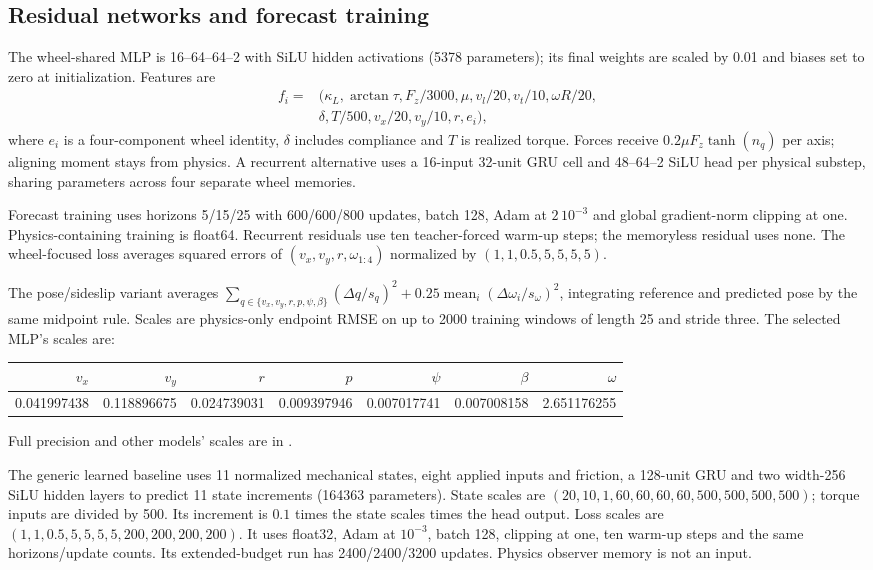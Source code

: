 \documentclass[11pt]{article}
\newcommand{\src}[1]{\texttt{\detokenize{#1}}}
\begin{document}
\subsection{Residual networks and forecast training}
The wheel-shared MLP is 16--64--64--2 with SiLU hidden activations (5378 parameters); its final weights are scaled by 0.01 and biases set to zero at initialization. Features are
\begin{align*}
f_i={}&(\kappa_L,\arctan\tau,F_z/3000,\mu,v_l/20,v_t/10,\omega R/20,\\
&\delta,T/500,v_x/20,v_y/10,r,e_i),
\end{align*}
where $e_i$ is a four-component wheel identity, $\delta$ includes compliance and $T$ is realized torque. Forces receive $0.2\mu F_z\tanh(n_q)$ per axis; aligning moment stays from physics. A recurrent alternative uses a 16-input 32-unit GRU cell and 48--64--2 SiLU head per physical substep, sharing parameters across four separate wheel memories.

Forecast training uses horizons 5/15/25 with 600/600/800 updates, batch 128, Adam at $2\,10^{-3}$ and global gradient-norm clipping at one. Physics-containing training is float64. Recurrent residuals use ten teacher-forced warm-up steps; the memoryless residual uses none. The wheel-focused loss averages squared errors of $(v_x,v_y,r,\omega_{1:4})$ normalized by $(1,1,0.5,5,5,5,5)$.

The pose/sideslip variant averages $\sum_{q\in\{v_x,v_y,r,p,\psi,\beta\}}(\Delta q/s_q)^2+0.25\operatorname{mean}_i(\Delta\omega_i/s_\omega)^2$, integrating reference and predicted pose by the same midpoint rule. Scales are physics-only endpoint RMSE on up to 2000 training windows of length 25 and stride three. The selected MLP's scales are:
\begin{center}\small
\begin{tabular}{rrrrrrr}\toprule
$v_x$ & $v_y$ & $r$ & $p$ & $\psi$ & $\beta$ & $\omega$\\\midrule
0.041997438 & 0.118896675 & 0.024739031 & 0.009397946 & 0.007017741 & 0.007008158 & 2.651176255\\\bottomrule
\end{tabular}\end{center} Full precision and other models' scales are in \src{training_configs.json}.

The generic learned baseline uses 11 normalized mechanical states, eight applied inputs and friction, a 128-unit GRU and two width-256 SiLU hidden layers to predict 11 state increments (164363 parameters). State scales are $(20,10,1,60,60,60,60,500,500,500,500)$; torque inputs are divided by 500. Its increment is $0.1$ times the state scales times the head output. Loss scales are $(1,1,0.5,5,5,5,5,200,200,200,200)$. It uses float32, Adam at $10^{-3}$, batch 128, clipping at one, ten warm-up steps and the same horizons/update counts. Its extended-budget run has 2400/2400/3200 updates. Physics observer memory is not an input.
\end{document}
